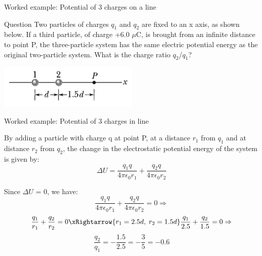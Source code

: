 
%
%

{
\problemslide

\begin{frame}{Worked example: Potential of 3 charges on a line }

\begin{blockexmplque}{Question}
    Two particles of charges $q_1$ and $q_2$ are fixed to an x axis,
  	as shown below.
    If a third particle, of charge +6.0 $\mu$C, is brought from an infinite
  	distance to point P, the three-particle system has the same electric
  	potential energy as the original two-particle system.
  	What is the charge ratio $q_2$/$q_1$?
    \begin{center}
      \includegraphics[width=0.50\textwidth]{./images/problems/lect03_2_point_charges}
    \end{center}
\end{blockexmplque}

\end{frame}

%
%
%

\begin{frame}{Worked example: Potential of 3 charges in line }

By adding a particle with charge q at point P,
at a distance $r_1$ from $q_1$ and at distance $r_2$ from $q_2$,
the change in the electrostatic potential
energy of the system is given by:
\begin{equation*}
  	{\Delta}U = \frac{q_1 q}{4\pi\epsilon_0 r_1} + \frac{q_2 q}{4\pi\epsilon_0 r_2}
\end{equation*}

Since ${\Delta}U$ = 0, we have:
\begin{equation*}
	\frac{q_1 q}{4\pi\epsilon_0 r_1} + \frac{q_2 q}{4\pi\epsilon_0 r_2} = 0 \Rightarrow
\end{equation*}
\begin{equation*}
	\frac{q_1}{r_1} + \frac{q_2}{r_2} = 0 \xRightarrow{r_1=2.5d,\;r_2=1.5d}
	\frac{q_1}{2.5} + \frac{q_2}{1.5} = 0 \Rightarrow
\end{equation*}
\begin{equation*}
	\frac{q_2}{q_1} = -\frac{1.5}{2.5} = -\frac{3}{5} = -0.6
\end{equation*}

\end{frame}

} %

